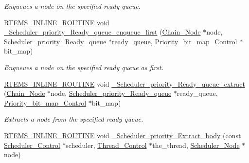 \begin{DoxyCompactItemize}
\begin{DoxyCompactList}\small\item\em Enqueues a node on the specified ready queue. \end{DoxyCompactList}\item 
\mbox{\hyperlink{group__RTEMSScoreBaseDefs_gac216239df231d5dbd15e3520b0b9313f}{R\+T\+E\+M\+S\+\_\+\+I\+N\+L\+I\+N\+E\+\_\+\+R\+O\+U\+T\+I\+NE}} void \mbox{\hyperlink{group__RTEMSScoreSchedulerDPS_ga0868a355751996dd45401461948ce5db}{\+\_\+\+Scheduler\+\_\+priority\+\_\+\+Ready\+\_\+queue\+\_\+enqueue\+\_\+first}} (\mbox{\hyperlink{group__RTEMSScoreChain_ga0dd4bfcca1ac7f90de2842e447846d3d}{Chain\+\_\+\+Node}} $\ast$node, \mbox{\hyperlink{structScheduler__priority__Ready__queue}{Scheduler\+\_\+priority\+\_\+\+Ready\+\_\+queue}} $\ast$ready\+\_\+queue, \mbox{\hyperlink{structPriority__bit__map__Control}{Priority\+\_\+bit\+\_\+map\+\_\+\+Control}} $\ast$bit\+\_\+map)
\begin{DoxyCompactList}\small\item\em Enqueues a node on the specified ready queue as first. \end{DoxyCompactList}\item 
\mbox{\hyperlink{group__RTEMSScoreBaseDefs_gac216239df231d5dbd15e3520b0b9313f}{R\+T\+E\+M\+S\+\_\+\+I\+N\+L\+I\+N\+E\+\_\+\+R\+O\+U\+T\+I\+NE}} void \mbox{\hyperlink{group__RTEMSScoreSchedulerDPS_ga50249c9f6e86f80647058f85f4df62cb}{\+\_\+\+Scheduler\+\_\+priority\+\_\+\+Ready\+\_\+queue\+\_\+extract}} (\mbox{\hyperlink{group__RTEMSScoreChain_ga0dd4bfcca1ac7f90de2842e447846d3d}{Chain\+\_\+\+Node}} $\ast$node, \mbox{\hyperlink{structScheduler__priority__Ready__queue}{Scheduler\+\_\+priority\+\_\+\+Ready\+\_\+queue}} $\ast$ready\+\_\+queue, \mbox{\hyperlink{structPriority__bit__map__Control}{Priority\+\_\+bit\+\_\+map\+\_\+\+Control}} $\ast$bit\+\_\+map)
\begin{DoxyCompactList}\small\item\em Extracts a node from the specified ready queue. \end{DoxyCompactList}\item 
\mbox{\hyperlink{group__RTEMSScoreBaseDefs_gac216239df231d5dbd15e3520b0b9313f}{R\+T\+E\+M\+S\+\_\+\+I\+N\+L\+I\+N\+E\+\_\+\+R\+O\+U\+T\+I\+NE}} void \mbox{\hyperlink{group__RTEMSScoreSchedulerDPS_gaedde62e7cf01a24fac59b6ad06d3cb08}{\+\_\+\+Scheduler\+\_\+priority\+\_\+\+Extract\+\_\+body}} (const \mbox{\hyperlink{struct__Scheduler__Control}{Scheduler\+\_\+\+Control}} $\ast$scheduler, \mbox{\hyperlink{struct__Thread__Control}{Thread\+\_\+\+Control}} $\ast$the\+\_\+thread, \mbox{\hyperlink{structScheduler__Node}{Scheduler\+\_\+\+Node}} $\ast$node)

\end{DoxyCompactItemize}
